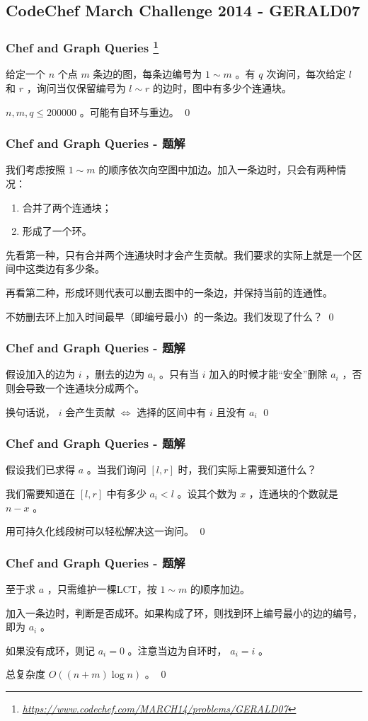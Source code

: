\documentclass[9pt,dvipsnames,table]{beamer}
\newcommand{\hlink}[1]{
	\footnote{\fontsize{6pt}{\baselineskip}\href{#1}{\textsl{\underline{#1}}}}
}
\newenvironment{qedframe}{%
	\begin{frame}[environment=qedqedframe]%
	}{%
	\qed
	\end{frame}%
}
\begin{document}
\subsection{CodeChef March Challenge 2014 - GERALD07}
\begin{qedframe}
	\frametitle{Chef and Graph Queries\hlink{https://www.codechef.com/MARCH14/problems/GERALD07}}
	给定一个 $ n $ 个点 $ m $ 条边的图，每条边编号为 $ 1\sim m $ 。有 $ q $ 次询问，每次给定 $ l $ 和 $ r $ ，询问当仅保留编号为 $ l\sim r $ 的边时，图中有多少个连通块。
	
	 $ n,m,q\leq 200000 $ 。可能有自环与重边。
\end{qedframe}
\begin{qedframe}
	\frametitle{Chef and Graph Queries - 题解}
	我们考虑按照 $ 1\sim m $ 的顺序依次向空图中加边。加入一条边时，只会有两种情况：
	\begin{enumerate}
		\item 合并了两个连通块；
		\item 形成了一个环。
	\end{enumerate} \pause
	
	先看第一种，只有合并两个连通块时才会产生贡献。我们要求的实际上就是一个区间中这类边有多少条。 \pause
	
	再看第二种，形成环则代表可以删去图中的一条边，并保持当前的连通性。
	
	不妨删去环上加入时间最早（即编号最小）的一条边。我们发现了什么？
\end{qedframe}
\begin{qedframe}
	\frametitle{Chef and Graph Queries - 题解}
	假设加入的边为 $ i $ ，删去的边为 $ a_i $ 。只有当 $ i $ 加入的时候才能``安全''删除 $ a_i $ ，否则会导致一个连通块分成两个。 \pause
	
	换句话说， $ i $ 会产生贡献 $ \iff $ 选择的区间中有 $ i $ 且没有 $ a_i $ 
\end{qedframe}
\begin{qedframe}
	\frametitle{Chef and Graph Queries - 题解}
	假设我们已求得 $ a $ 。当我们询问 $ [l,r] $ 时，我们实际上需要知道什么？ \pause
	
	我们需要知道在 $ [l,r] $ 中有多少 $ a_i<l $ 。设其个数为 $ x $ ，连通块的个数就是 $ n-x $ 。 \pause
	
	用可持久化线段树可以轻松解决这一询问。
\end{qedframe}
\begin{qedframe}
	\frametitle{Chef and Graph Queries - 题解}
	至于求 $ a $ ，只需维护一棵LCT，按 $ 1\sim m $ 的顺序加边。
	
	加入一条边时，判断是否成环。如果构成了环，则找到环上编号最小的边的编号，即为 $ a_i $ 。
	
	如果没有成环，则记 $ a_i=0 $ 。注意当边为自环时， $ a_i=i $ 。
	
	总复杂度 $ O((n+m)\log n) $ 。
\end{qedframe}
\end{document}
